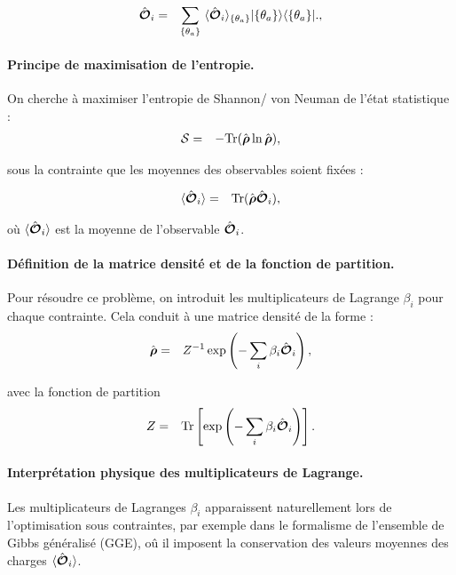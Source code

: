 \begin{eqnarray}
	\operator{\mathcal{O}}_i & = & \sum_{ \{\theta_a\} }   \langle \operator{\mathcal{O}}_i \rangle_{\{\theta_a \}}  \vert \{ \theta_a\}\rangle	\langle \{ \theta_a \}\vert.,		
\end{eqnarray}


\paragraph{Principe de maximisation de l'entropie.}
On cherche à maximiser l'entropie de Shannon/ von Neuman de l’état statistique :
\begin{eqnarray}
	\mathcal{S} & = & -\mathrm{Tr} ( \hat{\bm{\rho}} \ln \hat{\bm{\rho}} ) , 	
\end{eqnarray}

sous la contrainte que les moyennes des observables soient fixées :

\begin{eqnarray}
	\langle \hat{\bm{\mathcal{O}}}_i \rangle & = & 	\mathrm{Tr} ( \hat{\bm{\rho}} \hat{\bm{\mathcal{O}}}_i ) ,
\end{eqnarray}

où $\langle \hat{\bm{\mathcal{O}}}_i \rangle$ est la moyenne de l'observable $\hat{\bm{\mathcal{O}}}_i$.

\paragraph{Définition de la matrice densité et de la fonction de partition.}
Pour résoudre ce problème, on introduit les multiplicateurs de Lagrange $\beta_i$ pour chaque contrainte. Cela conduit à une matrice densité de la forme : 
\begin{eqnarray}
	 \hat{\bm{\rho}} &= & Z^{-1} \exp \left ( - \sum_i \beta_i \hat{\bm{\mathcal{O}}}_i \right ) , 		
\end{eqnarray}

avec la fonction de partition 
\begin{eqnarray}
	Z & = & \mathrm{Tr} \left [ \exp \left ( - \sum_i \beta_i \hat{\bm{\mathcal{O}}}_i \right ) \right ]. 	
\end{eqnarray}
 \paragraph{Interprétation physique des multiplicateurs de Lagrange.}
Les multiplicateurs de Lagranges $\beta_i$ apparaissent naturellement lors de l'optimisation sous contraintes, par exemple dans le formalisme de l'ensemble de Gibbs généralisé (GGE), oû il imposent la conservation des valeurs moyennes des charges $\langle \hat{\bm{\mathcal{O}}}_i \rangle $.


